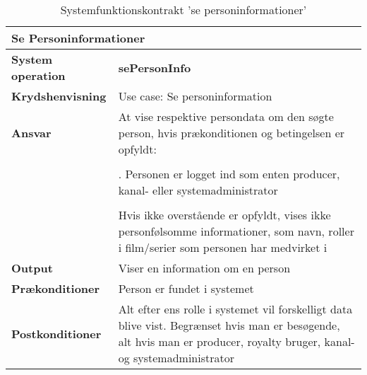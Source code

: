 \begin{table}[ht]
    \begin{tabularx}{\textwidth}{|p{4cm}|X|}
        \hline
        \multicolumn{2}{|X|}{\textbf{Se Personinformationer}}\\
        \hline
        \textbf{System operation}       & \textbf{sePersonInfo} \\ \hline
        \textbf{Krydshenvisning}        & Use case: Se personinformation \\ \hline
        \textbf{Ansvar}                 & At vise respektive persondata om den søgte person, hvis prækonditionen og betingelsen er opfyldt:\\
                                        & \\
                                        & \quad 1. Personen er logget ind som enten producer, kanal- eller systemadministrator\\
                                        & \\
                                        & Hvis ikke overstående er opfyldt, vises ikke personfølsomme informationer, som navn, roller i film/serier som personen har medvirket i\\ \hline
        \textbf{Output}                 & Viser en information om en person \\ \hline
        \textbf{Prækonditioner}         & Person er fundet i systemet \\ \hline
        \textbf{Postkonditioner}        & Alt efter ens rolle i systemet vil forskelligt data blive vist. Begrænset hvis man er besøgende, alt hvis man er producer, royalty bruger, kanal- og systemadministrator \\ \hline
    \end{tabularx}
    \caption{Systemfunktionskontrakt 'se personinformationer'}
    \label{tab:kontrakter_se_personinformationer}
\end{table}

